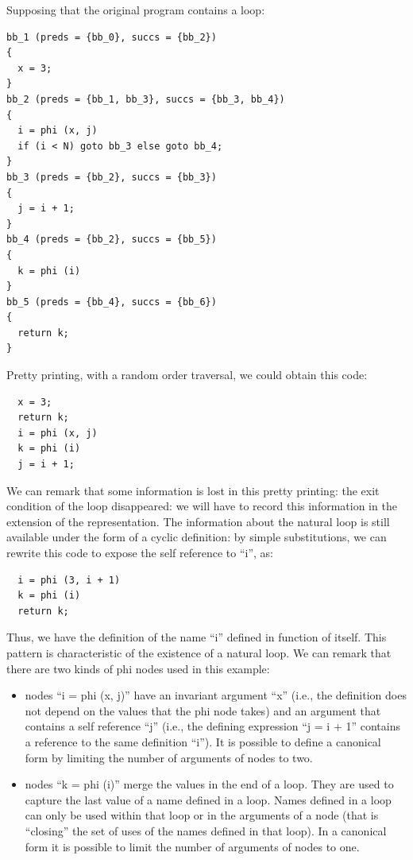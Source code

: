 Supposing that the original program contains a loop:
\begin{verbatim}
bb_1 (preds = {bb_0}, succs = {bb_2})
{
  x = 3;
}
bb_2 (preds = {bb_1, bb_3}, succs = {bb_3, bb_4})
{
  i = phi (x, j)
  if (i < N) goto bb_3 else goto bb_4;
}
bb_3 (preds = {bb_2}, succs = {bb_3})
{
  j = i + 1;
}
bb_4 (preds = {bb_2}, succs = {bb_5})
{
  k = phi (i)
}
bb_5 (preds = {bb_4}, succs = {bb_6})
{
  return k;
}
\end{verbatim}
Pretty printing, with a random order traversal, we could obtain this
\SSA{} code:
\begin{verbatim}
  x = 3;
  return k;
  i = phi (x, j)
  k = phi (i)
  j = i + 1;
\end{verbatim}
We can remark that some information is lost in this pretty printing:
the exit condition of the loop disappeared: we will have to record
this information in the extension of the \SSA{} representation.  The
information about the natural loop is still available under the form
of a cyclic definition: by simple substitutions, we can rewrite this
\SSA{} code to expose the self reference to ``i'', as:
\begin{verbatim}
  i = phi (3, i + 1)
  k = phi (i)
  return k;
\end{verbatim}
Thus, we have the definition of the \SSA{} name ``i'' defined in
function of itself.  This pattern is characteristic of the existence
of a natural loop.  We can remark that there are two kinds of phi
nodes used in this example:
\begin{itemize}
\item \loopphi{} nodes ``i = phi (x, j)'' have an invariant argument
  ``x'' (i.e., the definition does not depend on the values that the
  phi node takes) and an argument that contains a self reference ``j''
  (i.e., the defining expression ``j = i + 1'' contains a reference to
  the same \loopphi{} definition ``i'').  It is possible to define a
  canonical \SSA{} form by limiting the number of arguments of
  \loopphi{} nodes to two.
\item \closephi{} nodes ``k = phi (i)'' merge the values in the end of
  a loop.  They are used to capture the last value of a name defined
  in a loop.  Names defined in a loop can only be used within that
  loop or in the arguments of a \closephi{} node (that is ``closing''
  the set of uses of the names defined in that loop).  In a canonical
  \SSA{} form it is possible to limit the number of arguments of
  \closephi{} nodes to one.
\end{itemize}


